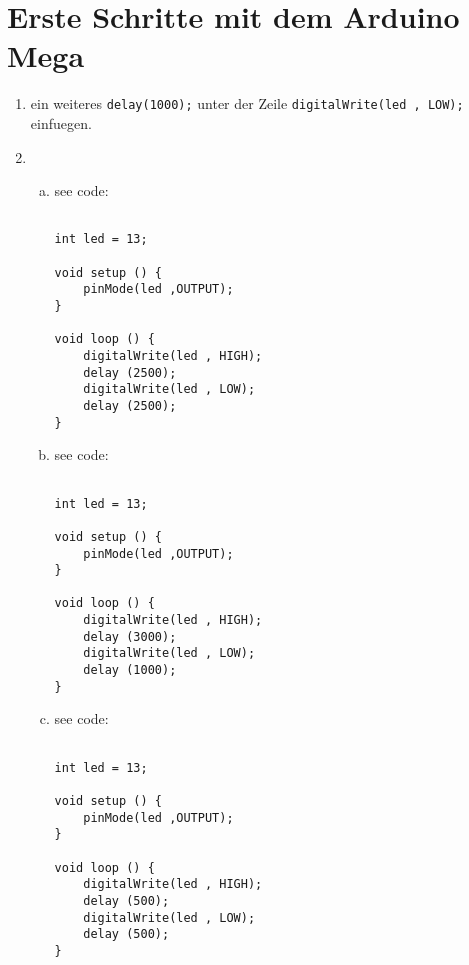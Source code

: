 \documentclass[12pt]{article}
\begin{document}
\lstset{language=C++}

\section{ Erste Schritte mit dem Arduino Mega}
\begin{enumerate}
    \item 
        ein weiteres \verb!delay(1000);! unter der Zeile \verb!digitalWrite(led , LOW);! einfuegen.
    \item
        \begin{enumerate}[a)]
            \item 
                see code:\\
\begin{lstlisting}[frame=single]  % Start your code-block

int led = 13;

void setup () {
    pinMode(led ,OUTPUT);
}

void loop () {
    digitalWrite(led , HIGH);
    delay (2500);
    digitalWrite(led , LOW);
    delay (2500);
}
\end{lstlisting}

            \item
                see code:\\
\begin{lstlisting}[frame=single]  % Start your code-block

int led = 13;

void setup () {
    pinMode(led ,OUTPUT);
}

void loop () {
    digitalWrite(led , HIGH);
    delay (3000);
    digitalWrite(led , LOW);
    delay (1000);
}
\end{lstlisting}


\newpage
            \item
                see code:\\
\begin{lstlisting}[frame=single]  % Start your code-block

int led = 13;

void setup () {
    pinMode(led ,OUTPUT);
}

void loop () {
    digitalWrite(led , HIGH);
    delay (500);
    digitalWrite(led , LOW);
    delay (500);
}
\end{lstlisting}
                
        \end{enumerate}
\end{enumerate}
\end{document}
